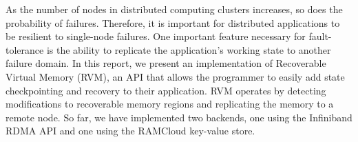 As the number of nodes in distributed computing clusters increases, so does the probability of failures. Therefore, it is important for distributed applications to be resilient to single-node failures. 
One important feature necessary for fault-tolerance is the ability to replicate the application's working state to another failure domain. In this report, we present an implementation of Recoverable Virtual Memory (RVM), an API that allows the programmer to easily add state checkpointing and recovery to their application. RVM operates by detecting modifications to recoverable memory regions and replicating the memory to a remote node. So far, we have implemented two backends, one using the Infiniband RDMA API and one using the RAMCloud key-value store.

